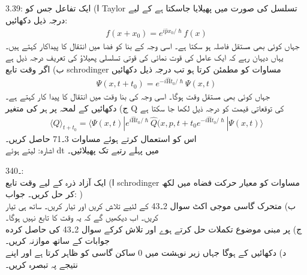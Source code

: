  3.39:
ا) ایک تفاعل
 جس کو Taylor تسلسل کی صورت میں پھیلایا جاسکتا ہے کے لیے درجہ ذيل  دکھائیں:\\
\begin{align}f(x+x_{0})=e^{i\hat{p}x_{0}/\hslash}f(x)\end{align}
جہاں
کوئی بھی مستقل فاصلہ ہو سکتا ہے۔ اسی وجہ کے بنا 
کو فضا میں  انتقال کا پیداکار کہتے ہیں۔ یہاں دیہان رہے کہ ایک عامل کی قوت نمائی کی قوتی تسلسلی پھیلاؤ کی تعریف درجہ ذیل ہے
\\
ب) اگر
وقت تابع schrodinger مساوات کو مطمئن کرتا ہو تب درجہ ذیل دکھائیں\\
\begin{align}\Psi(x,t+t_{0})=e^{-i\hat{\text{H}}t_{0}/\hslash}\Psi(x,t)\end{align}
جہاں
کوئی بھی مستقل وقت ہوگا۔ اسی وجہ کی بنا
وقت میں انتقال کا پیدا کار کہتے ہے۔\\
ج) دکھائیں کے لمحہ
پر ہر کی متغير Q کی توقعاتی قیمت کو درجہ ذيل لکھا جا سکتا ہے\\
\begin{align}\langle Q \rangle _{t+t_{0}}=\langle \Psi(x,t)|e^{i\hat{\text{H}}t_{0}/\hslash}\hat{Q}(x,p,t+t_{0}e^{-i\hat{\text{H}}t_{0}/\hslash}|\Psi(x,t)\rangle\end{align}
اس کو استعمال کرتے ہوئے مساوات 3۔71 حاصل كریں۔\\
اشاره:
لیتے ہوئے dt میں پہلے رتبے تک پھیلائیں۔

 3۔40:\\
ا) ایک آزاد ذرہ کے لیے وقت تابع schrodinger مساوات کو معیار حرکت فضاه میں لکھ کر حل کریں۔
جواب:  
)\\
ب) متحرک گاسی موجی اکٹ سوال 2۔43 کے لئیے
تلاش كريں اور
تیار كریں۔ ساتھ ہی
تیار كريں۔ اب دیکھیں گے کہ یہ وقت کا تابع نہیں ہوگا۔\\
ج)
پر مبنی موضوع تكملات حل کرتے ہوے
اور
تلاش کرکے سوال 2۔43 کی حاصل كرده جوابات کے ساتھ موازنہ كريں۔\\
د) دکھائیں کے
ہوگا جہاں زیر نوہشت میں 0 ساکن گاسی کو ظاہر کرتا ہے اور اپنے نتیجے پہ تبصرہ کریں۔



